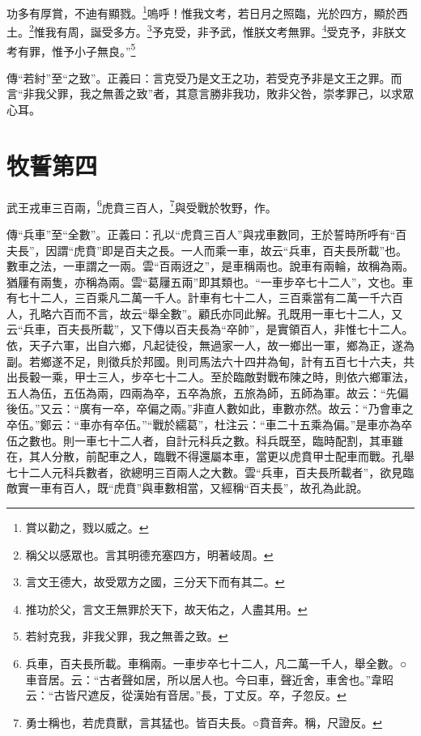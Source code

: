 功多有厚賞，不迪有顯戮。\footnote{賞以勸之，戮以威之。}嗚呼！惟我文考，若日月之照臨，光於四方，顯於西土。\footnote{稱父以感眾也。言其明德充塞四方，明著岐周。}惟我有周，誕受多方。\footnote{言文王德大，故受眾方之國，三分天下而有其二。}予克受，非予武，惟朕文考無罪。\footnote{推功於父，言文王無罪於天下，故天佑之，人盡其用。}受克予，非朕文考有罪，惟予小子無良。”\footnote{若紂克我，非我父罪，我之無善之致。}

{\noindent\zhuan{}\fzbyks 傳“若紂”至“之致”。正義曰：言克受乃是文王之功，若受克予非是文王之罪。而言“非我父罪，我之無善之致”者，其意言勝非我功，敗非父咎，崇孝罪己，以求眾心耳。 \par}

\section{牧誓第四}


武王戎車三百兩，\footnote{兵車，百夫長所載。車稱兩。一車步卒七十二人，凡二萬一千人，舉全數。○車音居。云：“古者聲如居，所以居人也。今曰車，聲近舍，車舍也。”韋昭云：“古皆尺遮反，從漢始有音居。”長，丁丈反。卒，子忽反。}虎賁三百人，\footnote{勇士稱也，若虎賁獸，言其猛也。皆百夫長。○賁音奔。稱，尺證反。}與受戰於牧野，作。

{\noindent\zhuan{}\fzbyks 傳“兵車”至“全數”。正義曰：孔以“虎賁三百人”與戎車數同，王於誓時所呼有“百夫長”，因謂“虎賁”即是百夫之長。一人而乘一車，故云“兵車，百夫長所載”也。數車之法，一車謂之一兩。雲“百兩迓之”，是車稱兩也。說車有兩輪，故稱為兩。猶屨有兩隻，亦稱為兩。雲“葛屨五兩”即其類也。“一車步卒七十二人”，文也。車有七十二人，三百乘凡二萬一千人。計車有七十二人，三百乘當有二萬一千六百人，孔略六百而不言，故云“舉全數”。顧氏亦同此解。孔既用一車七十二人，又云“兵車，百夫長所載”，又下傳以百夫長為“卒帥”，是實領百人，非惟七十二人。依，天子六軍，出自六鄉，凡起徒役，無過家一人，故一鄉出一軍，鄉為正，遂為副。若鄉遂不足，則徵兵於邦國。則司馬法六十四井為甸，計有五百七十六夫，共出長轂一乘，甲士三人，步卒七十二人。至於臨敵對戰布陳之時，則依六鄉軍法，五人為伍，五伍為兩，四兩為卒，五卒為旅，五旅為師，五師為軍。故云：“先偏後伍。”又云：“廣有一卒，卒偏之兩。”非直人數如此，車數亦然。故云：“乃會車之卒伍。”鄭云：“車亦有卒伍。”“戰於繻葛”，杜注云：“車二十五乘為偏。”是車亦為卒伍之數也。則一車七十二人者，自計元科兵之數。科兵既至，臨時配割，其車雖在，其人分散，前配車之人，臨戰不得還屬本車，當更以虎賁甲士配車而戰。孔舉七十二人元科兵數者，欲總明三百兩人之大數。雲“兵車，百夫長所載者”，欲見臨敵實一車有百人，既“虎賁”與車數相當，又經稱“百夫長”，故孔為此說。 \par}

